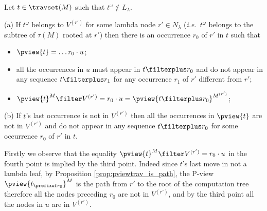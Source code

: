 \begin{lemma}
\label{lem:pview_trav_filtering}
   Let $t \in \travset(M)$ such that $t^\omega \not\in L_\lambda$.
        \begin{compactitem}
        \item[(a)] If $t^\omega$ belongs to $V^{(r')}$ for some lambda node $r'\in N_\lambda$
        ({\it i.e.}\ $t^\omega$ belongs to the subtree of $\tau(M)$ rooted at $r'$) then there is an occurrence $r_0$ of $r'$ in $t$ such that
        \begin{itemize}
        \item $\pview{t} = \ldots r_0 \cdot u$;
        \item all the occurrences in $u$ must appear in $t\filterplus r_0$ and do not appear
        in any sequence $t\filterplus r_1$ for any occurrence
        $r_1$ of $r'$ different from $r'$;
        \item $\pview{t}^M \filter V^{(r')} = r_0\cdot u =  \pview{t\filterplus r_0}^{M^{(r')}}$;
        \end{itemize}

        \item[(b)] If $t$'s last occurrence is not in $V^{(r')}$ then
        all the occurrences in $\pview{t}$ are not in
        $V^{(r')}$ and do not appear in any sequence $t\filterplus r_0$ for some
        occurrence $r_0$ of $r'$ in $t$.
        \end{compactitem}
\end{lemma}
\proof
Firstly we observe that the equality $\pview{t}^M \filter V^{(r')} = r_0\cdot u$
in the fourth point is implied by the third point. Indeed since $t$'s last move in not a lambda leaf,
by Proposition \ref{prop:pviewtrav_is_path}, the P-view $\pview{t_{\prefixof r_0}}^M$ is the path from $r'$ to the root of the computation tree therefore all the nodes preceding $r_0$ are not in $V^{(r')}$, and by the third point all the nodes in $u$ are in $V^{(r')}$.

